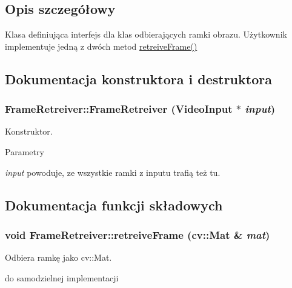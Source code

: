 \subsection{Opis szczegółowy}
Klasa definiująca interfejs dla klas odbierających ramki obrazu. Użytkownik implementuje jedną z dwóch metod \hyperlink{class_frame_retreiver_a061c97e43f3b73705903e49afad3e5bf}{retreiveFrame()} 

\subsection{Dokumentacja konstruktora i destruktora}
\hypertarget{class_frame_retreiver_aec5e4a7cd0af2badc9b47fd3c936ac60}{
\subsubsection[{FrameRetreiver}]{\setlength{\rightskip}{0pt plus 5cm}FrameRetreiver::FrameRetreiver ({\bf VideoInput} $\ast$ {\em input})}}
\label{class_frame_retreiver_aec5e4a7cd0af2badc9b47fd3c936ac60}


Konstruktor. 


\begin{DoxyParams}{Parametry}
\item[{\em input}]powoduje, ze wszystkie ramki z inputu trafią też tu. \end{DoxyParams}


\subsection{Dokumentacja funkcji składowych}
\hypertarget{class_frame_retreiver_a72912583af45c00d267f215a0d0b9bb1}{
\subsubsection[{retreiveFrame}]{\setlength{\rightskip}{0pt plus 5cm}void FrameRetreiver::retreiveFrame (cv::Mat \& {\em mat})}}
\label{class_frame_retreiver_a72912583af45c00d267f215a0d0b9bb1}


Odbiera ramkę jako cv::Mat. 

do samodzielnej implementacji 

